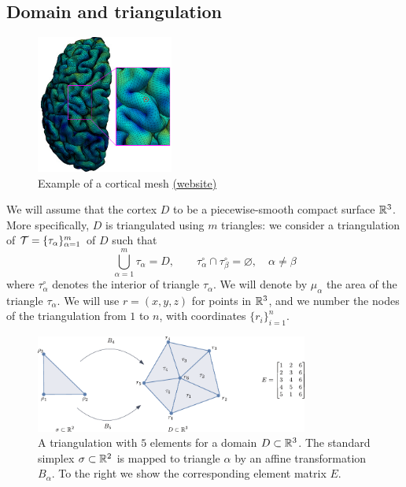 \documentclass[a4paper]{siamonline220329}
\theoremstyle{plain}
\begin{document}
\subsection{Domain and triangulation} \label{ssec:triangulation}

\begin{figure}
  \begin{center}
    \includegraphics[width=0.4\textwidth]{brain-mesh}
  \end{center}
  \caption{Example of a cortical mesh
    \href{https://www.med.unc.edu/bric/scientists-create-new-map-of-the-developing-cerebral-cortex/}{(website)}
  }
\end{figure}
We will assume that the cortex $D$ to be a piecewise-smooth compact surface
$\mathbb{R}^3$. More specifically, $D$ is triangulated using $m$ triangles: we consider a
triangulation of $\mathcal{T} = \{ \tau_\alpha \}_{\alpha = 1}^m$ of $D$ such
that 
\[ 
  \bigcup_{\alpha=1}^m \tau_\alpha = D, \qquad 
  \tau_\alpha^\circ \cap \tau_\beta^\circ = \varnothing, \quad \alpha \neq \beta 
\] 
where $\tau_\alpha^\circ$ denotes the interior of triangle $\tau_{\alpha}$. We will
denote by $\mu_\alpha$ the area of the triangle $\tau_\alpha$. We will use
$r=(x,y,z)$ for points in $\mathbb{R}^3$, and we number the nodes of the triangulation
from $1$ to $n$, with coordinates $\{ r_i \}_{i=1}^n$.


\begin{figure}
  \centering
  \includegraphics[width = 0.8\textwidth]{triangulation}
  \caption{A triangulation with $5$ elements for a domain $D \subset \mathbb{R}^3$. The
    standard simplex $\sigma \subset \mathbb{R}^2$ is mapped to triangle $\alpha$ by an
    affine transformation $B_\alpha$. To the right we show the corresponding element
  matrix $E$.}
  \label{fig:triangulation}
\end{figure}
\end{document}
